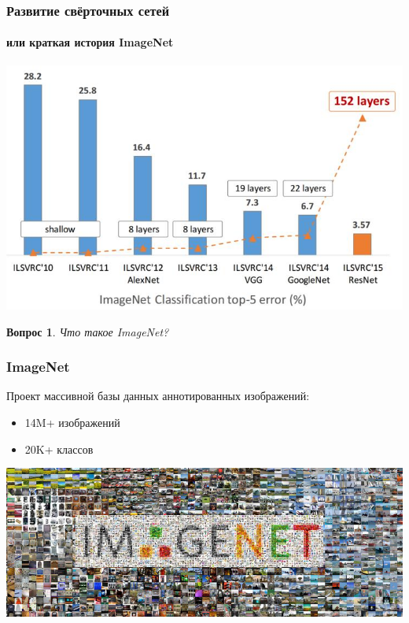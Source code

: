 \documentclass[fullscreen=true, bookmarks=true, hyperref={pdfencoding=unicode}]{beamer}
\newtheorem*{question}{Вопрос}
\begin{document}
\begin{frame}
  \frametitle{Развитие свёрточных сетей}
  \framesubtitle{или краткая история ImageNet}
  \begin{center}
    \includegraphics[keepaspectratio,
                     width=0.7\paperwidth]{image-net-history.jpg}
  \end{center}
\end{frame}


\begin{frame}
  \begin{question}
  Что такое ImageNet?
  \end{question}
\end{frame}


\begin{frame}
  \frametitle{ImageNet}
  Проект массивной базы данных аннотированных изображений:
  \begin{itemize}
    \item 14M+ изображений
    \item 20K+ классов
  \end{itemize}

  \includegraphics[keepaspectratio,
                   width=0.85\paperwidth]{ImageNet-Large-Scale.jpg}
\end{frame}
\end{document}
